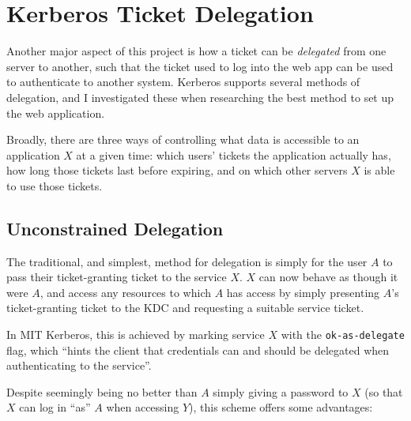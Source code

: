 \documentclass{report}
\begin{document}
\section{Kerberos Ticket Delegation}
\label{sec:kerberos_ticket_delegation}
Another major aspect of this project is how a ticket can be \textit{delegated} from one server to another, such that the ticket used to log into the web app can be used to authenticate to another system. Kerberos supports several methods of delegation, and I investigated these when researching the best method to set up the web application.

Broadly, there are three ways of controlling what data is accessible to an application $X$ at a given time: which users' tickets the application actually has, how long those tickets last before expiring, and on which other servers $X$ is able to use those tickets.

\subsection{Unconstrained Delegation}
The traditional, and simplest, method for delegation is simply for the user $A$ to pass their ticket-granting ticket to the service $X$. $X$ can now behave as though it were $A$, and access any resources to which $A$ has access by simply presenting $A$'s ticket-granting ticket to the KDC and requesting a suitable service ticket\cite{JohnKol-unconstrained-deleg}.

In MIT Kerberos, this is achieved by marking service $X$ with the \verb+ok-as-delegate+ flag, which ``hints the client that credentials can and should be delegated when authenticating to the service''\cite{KDC-conf-docs}.

Despite seemingly being no better than $A$ simply giving a password to $X$ (so that $X$ can log in ``as'' $A$ when accessing $Y$), this scheme offers some advantages:
\end{document}
